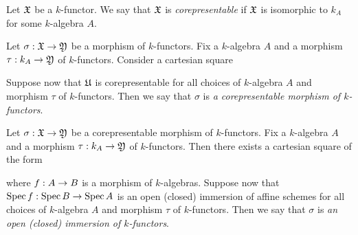 \begin{definition}
Let ${\mathfrak X}$ be a $k$-functor. We say that ${\mathfrak X}$ is \textit{corepresentable} if ${\mathfrak X}$ is isomorphic to $k_A$ for some $k$-algebra $A$. 
\end{definition}

\begin{definition}
Let $\sigma:{\mathfrak X}\rightarrow {\mathfrak Y}$ be a morphism of $k$-functors. Fix a $k$-algebra $A$ and a morphism $\tau:k_A\rightarrow {\mathfrak Y}$ of $k$-functors. Consider a cartesian square
\begin{center}
\end{center}
Suppose now that ${\mathfrak U}$ is corepresentable for all choices of $k$-algebra $A$ and morphism $\tau$ of $k$-functors. Then we say that $\sigma$ is  \textit{a corepresentable morphism of $k$-functors}.
\end{definition}

\begin{definition}
Let $\sigma:{\mathfrak X}\rightarrow {\mathfrak Y}$ be a corepresentable morphism of $k$-functors. Fix a $k$-algebra $A$ and a morphism $\tau:k_A\rightarrow {\mathfrak Y}$ of $k$-functors. Then there exists a cartesian square of the form
\begin{center}
\end{center}
where $f:A\rightarrow B$ is a morphism of $k$-algebras. Suppose now that $\mathrm{Spec}\, f:\mathrm{Spec}\, B\rightarrow \mathrm{Spec}\, A$ is an open (closed) immersion of affine schemes for all choices of $k$-algebra $A$ and morphism $\tau$ of $k$-functors. Then we say that $\sigma$ is  \textit{an open (closed) immersion of $k$-functors}.
\end{definition}

